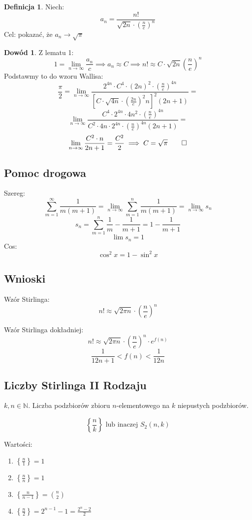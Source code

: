 \documentclass{article}
\theoremstyle{definition}
\newtheorem{de}{Definicja}[subsection]
\theoremstyle{definition}
\newtheorem{dd}{Dowód}[subsection]
\theoremstyle{definition}
\theoremstyle{definition}
\theoremstyle{definition}
\theoremstyle{definition}
\begin{document}
\begin{de}
    Niech:
    \[a_n = \frac{n!}{\sqrt{2n} \cdot \left(\frac{n}{e}\right)^n}\]
    Cel: pokazać, że $a_n \rightarrow \sqrt{\pi}$
\end{de}

\begin{dd}
    Z lematu 1:
    \[1 = \lim_{n\rightarrow \infty} \frac{a_n}{c} \implies a_n \approx C \implies n! \approx C\cdot \sqrt{2n} \left(\frac{n}{e}\right)^n\]
    Podstawmy to do wzoru Wallisa:
    \[\frac{\pi}{2} = \lim_{n\rightarrow \infty} \frac{2^{4n} \cdot C^4 \cdot (2n)^2 \cdot \left(\frac{n}{e}\right)^{4n}}{\left[C\cdot\sqrt{4n} \cdot \left(\frac{2n}{e}\right)^2n\right]^2 (2n+1)}=\]
    \[\lim_{n\rightarrow \infty} \frac{C^4 \cdot 2^{4n} \cdot 4n^2 \cdot \left(\frac{n}{e}\right)^{4n}}{C^2\cdot 4n \cdot 2^{4n} \cdot \left(\frac{n}{e}\right)^{4n} (2n+1)}=\]
    \[\lim_{n\rightarrow \infty} \frac{C^2\cdot n}{2n +1} = \frac{C^2}{2} \implies C=\sqrt{\pi}\qed\]
\end{dd}

\subsection{Pomoc drogowa}

Szereg:
\[\sum_{m=1}^{\infty} \frac{1}{m(m+1)} = \lim_{n\rightarrow \infty} \sum_{m=1}^{n} \frac{1}{m(m+1)} = \lim_{n\rightarrow \infty} s_n\]
\[s_n = \sum_{m=1}^{n} \frac{1}{m} - \frac{1}{m+1} = 1 - \frac{1}{m+1}\]
\[\lim s_n = 1\]
Cos:
\[\cos^2 x = 1 - \sin^2 x\]

\subsection{Wnioski}

Wzór Stirlinga:
\[n! \approx \sqrt{2\pi n} \cdot \left(\frac{n}{e}\right)^n\]

Wzór Stirlinga dokładniej:
\[n! \approx \sqrt{2\pi n} \cdot \left(\frac{n}{e}\right)^n \cdot e^{f(n)}\]
\[\frac{1}{12n+1} < f(n) < \frac{1}{12n}\]

\subsection{Liczby Stirlinga II Rodzaju}

$k, n \in \mathbb{N}$. Liczba podzbiorów zbioru $n$-elementowego na $k$ niepustych podzbiorów.

\[\left\{\frac{n}{k}\right\} \text{ lub inaczej } S_2(n,k)\] 

Wartości:
\begin{enumerate}
    \item $\left\{\frac{n}{1}\right\} = 1$
    \item $\left\{\frac{n}{n}\right\} = 1$
    \item $\left\{\frac{n}{n-1}\right\} = \binom{n}{2}$
    \item $\left\{\frac{n}{2}\right\} = 2^{n-1} - 1 = \frac{2^n - 2}{2}$
\end{enumerate}
\end{document}
